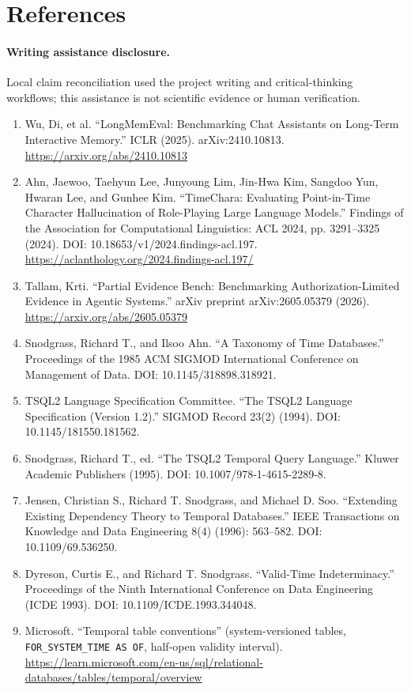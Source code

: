 \documentclass[11pt]{article}
\begin{document}
\section*{References}
\paragraph{Writing assistance disclosure.} Local claim reconciliation used the project writing and critical-thinking workflows; this assistance is not scientific evidence or human verification.
\sloppy
\begin{enumerate}[leftmargin=*]
\item Wu, Di, et al. ``LongMemEval: Benchmarking Chat Assistants on Long-Term Interactive Memory.'' ICLR (2025). arXiv:2410.10813. \url{https://arxiv.org/abs/2410.10813}
\item Ahn, Jaewoo, Taehyun Lee, Junyoung Lim, Jin-Hwa Kim, Sangdoo Yun, Hwaran Lee, and Gunhee Kim. ``TimeChara: Evaluating Point-in-Time Character Hallucination of Role-Playing Large Language Models.'' Findings of the Association for Computational Linguistics: ACL 2024, pp. 3291--3325 (2024). DOI: 10.18653/v1/2024.findings-acl.197. \url{https://aclanthology.org/2024.findings-acl.197/}
\item Tallam, Krti. ``Partial Evidence Bench: Benchmarking Authorization-Limited Evidence in Agentic Systems.'' arXiv preprint arXiv:2605.05379 (2026). \url{https://arxiv.org/abs/2605.05379}
\item Snodgrass, Richard T., and Ilsoo Ahn. ``A Taxonomy of Time Databases.'' Proceedings of the 1985 ACM SIGMOD International Conference on Management of Data. DOI: 10.1145/318898.318921.
\item TSQL2 Language Specification Committee. ``The TSQL2 Language Specification (Version 1.2).'' SIGMOD Record 23(2) (1994). DOI: 10.1145/181550.181562.
\item Snodgrass, Richard T., ed. ``The TSQL2 Temporal Query Language.'' Kluwer Academic Publishers (1995). DOI: 10.1007/978-1-4615-2289-8.
\item Jensen, Christian S., Richard T. Snodgrass, and Michael D. Soo. ``Extending Existing Dependency Theory to Temporal Databases.'' IEEE Transactions on Knowledge and Data Engineering 8(4) (1996): 563--582. DOI: 10.1109/69.536250.
\item Dyreson, Curtis E., and Richard T. Snodgrass. ``Valid-Time Indeterminacy.'' Proceedings of the Ninth International Conference on Data Engineering (ICDE 1993). DOI: 10.1109/ICDE.1993.344048.
\item Microsoft. ``Temporal table conventions'' (system-versioned tables, \texttt{FOR\_SYSTEM\_TIME AS OF}, half-open validity interval). \url{https://learn.microsoft.com/en-us/sql/relational-databases/tables/temporal/overview}

\end{enumerate}
\end{document}
